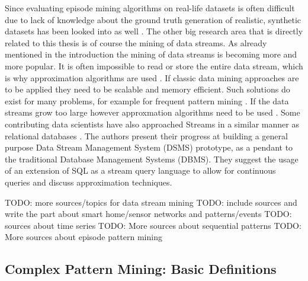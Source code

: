 \documentclass[journal]{IEEEtran}
\begin{document}
Since evaluating episode mining algorithms on real-life datasets is often difficult due to lack of knowledge about the ground truth generation of realistic, synthetic datasets has been looked into as well \cite{generatingEpisodeDatasets}.
The other big research area that is directly related to this thesis is of course the mining of data streams. As already mentioned in the introduction the mining of data streams is becoming more and more popular. It is often impossible to read or store the entire data stream, which is why approximation algorithms are used \cite{unknownbook}. If classic data mining approaches are to be applied they need to be scalable and memory efficient. Such solutions do exist for many problems, for example for frequent pattern mining \cite{fastFrequentPattern}. If the data streams grow too large however approxmation algorithms need to be used \cite{approxfreq}.\newline
Some contributing data scientists have also approached Streams in a similar manner as relational databases \cite{dsms}. The authors present their progress at building a general purpose Data Stream Management System (DSMS) prototype, as a pendant to the traditional Database Management Systems (DBMS). They suggest the usage of an extension of SQL as a stream query language to allow for continuous queries and discuss approximation techniques.

TODO: more sources/topics for data stream mining \newline
TODO: include sources and write the part about smart home/sensor networks and patterns/events \newline
TODO: sources about time series \newline
TODO: More sources about sequential patterns \newline
TODO: More sources about episode pattern mining \newline

\subsection{Complex Pattern Mining: Basic Definitions}
\end{document}
